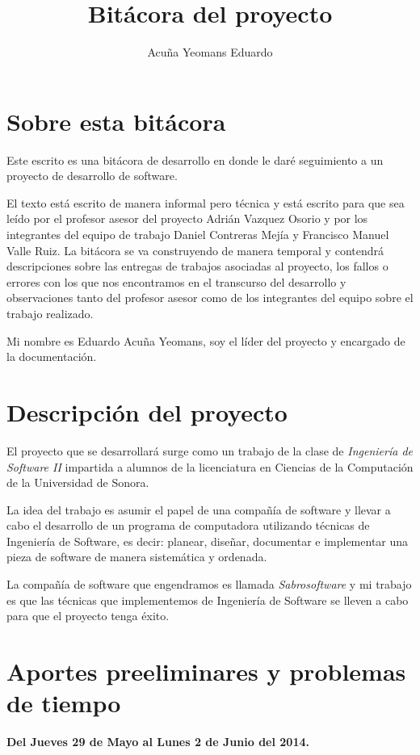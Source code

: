 \documentclass[letterpaper]{article}
\title{Bitácora del proyecto}
\author{Acuña Yeomans Eduardo}
\date{}
\begin{document}
\maketitle

\section{Sobre esta bitácora}
Este escrito es una bitácora de desarrollo en donde le daré seguimiento a un proyecto de desarrollo de software.

El texto está escrito de manera informal pero técnica y está escrito para que sea leído por el profesor asesor del proyecto Adrián Vazquez Osorio y por los integrantes del equipo de trabajo Daniel Contreras Mejía y Francisco Manuel Valle Ruiz. La bitácora se va construyendo de manera temporal y contendrá descripciones sobre las entregas de trabajos asociadas al proyecto, los fallos o errores con los que nos encontramos en el transcurso del desarrollo y observaciones tanto del profesor asesor como de los integrantes del equipo sobre el trabajo realizado.

Mi nombre es Eduardo Acuña Yeomans, soy el líder del proyecto y encargado de la documentación.

\section{Descripción del proyecto}
El proyecto que se desarrollará surge como un trabajo de la clase de \emph{Ingeniería de Software II} impartida a alumnos de la licenciatura en Ciencias de la Computación de la Universidad de Sonora.

La idea del trabajo es asumir el papel de una compañía de software y llevar a cabo el desarrollo de un programa de computadora utilizando técnicas de Ingeniería de Software, es decir: planear, diseñar, documentar e implementar una pieza de software de manera sistemática y ordenada.

La compañía de software que engendramos es llamada \emph{Sabrosoftware} y mi trabajo es que las técnicas que implementemos de Ingeniería de Software se lleven a cabo para que el proyecto tenga éxito.

\section{Aportes preeliminares y problemas de tiempo}
\textbf{Del Jueves 29 de Mayo al Lunes 2 de Junio del 2014.}
\end{document}
